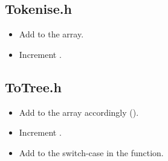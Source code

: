         \subsection*{Tokenise.h}
            \begin{itemize}
                \item Add to the  array.
                \item Increment .
            \end{itemize}

        \subsection*{ToTree.h}
            \begin{itemize}
                \item Add to the  array accordingly ().
                \item Increment .
                \item Add to the switch-case in the  function.
            \end{itemize}
